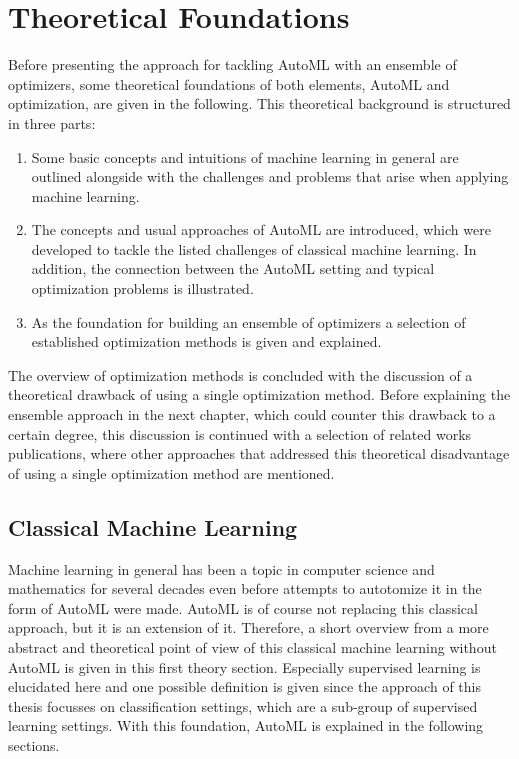 %
\chapter{Theoretical Foundations}
\label{sec:theory}
Before presenting the approach for tackling AutoML with an ensemble of optimizers, some theoretical foundations of both elements, AutoML and optimization, are given in the following.
This theoretical background is structured in three parts:
\begin{enumerate}
    \item Some basic concepts and intuitions of machine learning in general are outlined alongside with the challenges and problems that arise when applying machine learning.
    \item The concepts and usual approaches of AutoML are introduced, which were developed to tackle the listed challenges of classical machine learning. In addition, the connection between the AutoML setting and typical optimization problems is illustrated.
    \item As the foundation for building an ensemble of optimizers a selection of established optimization methods is given and explained.
\end{enumerate}
The overview of optimization methods is concluded with the discussion of a theoretical drawback of using a single optimization method.
Before explaining the ensemble approach in the next chapter, which could counter this drawback to a certain degree, this discussion is continued with a selection of related works publications, where other approaches that addressed this theoretical disadvantage of using a single optimization method are mentioned. 

\section{Classical Machine Learning}
\label{sec:theory:ml}
Machine learning in general has been a topic in computer science and mathematics for several decades even before attempts to autotomize it  in the form of AutoML were made.
AutoML is of course not replacing this classical approach, but it is an extension of it.
Therefore, a short overview from a more abstract and theoretical point of view of this classical machine learning without AutoML is given in this first theory section.
Especially supervised learning is elucidated here and one possible definition is given since the approach of this thesis focusses on classification settings, which are a sub-group of supervised learning settings.
With this foundation, AutoML is explained in the following sections.

